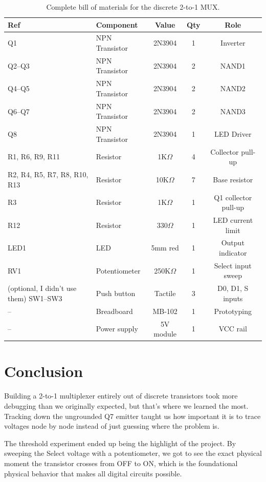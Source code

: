 \documentclass[11pt,a4paper]{article}
\begin{document}
\begin{table}[H]
\centering
\caption{Complete bill of materials for the discrete 2-to-1 MUX.}
\begin{tabular}{@{}llccc@{}}
\toprule
\textbf{Ref} & \textbf{Component} & \textbf{Value} & \textbf{Qty} & \textbf{Role} \\
\midrule
Q1 & NPN Transistor & 2N3904 & 1 & Inverter \\
Q2--Q3 & NPN Transistor & 2N3904 & 2 & NAND1 \\
Q4--Q5 & NPN Transistor & 2N3904 & 2 & NAND2 \\
Q6--Q7 & NPN Transistor & 2N3904 & 2 & NAND3 \\
Q8 & NPN Transistor & 2N3904 & 1 & LED Driver \\
R1, R6, R9, R11 & Resistor & 1K$\Omega$ & 4 & Collector pull-up \\
R2, R4, R5, R7, R8, R10, R13 & Resistor & 10K$\Omega$ & 7 & Base resistor \\
R3 & Resistor & 1K$\Omega$ & 1 & Q1 collector pull-up \\
R12 & Resistor & 330$\Omega$ & 1 & LED current limit \\
LED1 & LED & 5mm red & 1 & Output indicator \\
RV1 & Potentiometer & 250K$\Omega$ & 1 & Select input sweep \\
(optional, I didn't use them) SW1--SW3 & Push button & Tactile & 3 & D0, D1, S inputs \\
-- & Breadboard & MB-102 & 1 & Prototyping \\
-- & Power supply & 5V module & 1 & VCC rail \\
\bottomrule
\end{tabular}
\end{table}

\section{Conclusion}

Building a 2-to-1 multiplexer entirely out of discrete transistors took more debugging than we originally expected, but that's where we learned the most. Tracking down the ungrounded Q7 emitter taught us how important it is to trace voltages node by node instead of just guessing where the problem is.

The threshold experiment ended up being the highlight of the project. By sweeping the Select voltage with a potentiometer, we got to see the exact physical moment the transistor crosses from OFF to ON, which is the foundational physical behavior that makes all digital circuits possible.
\end{document}
